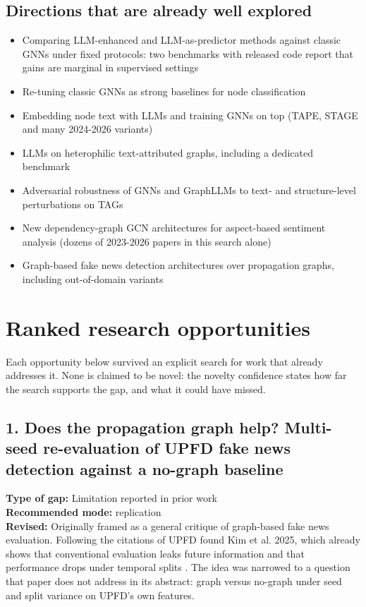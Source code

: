 \documentclass[11pt,a4paper]{article}
\begin{document}
\subsection{Directions that are already well explored}

\begin{itemize}
\item [V] Comparing LLM-enhanced and LLM-as-predictor methods against classic GNNs under fixed protocols: two benchmarks with released code report that gains are marginal in supervised settings \cite{li2024glbench,wu2025llmnodebed}
\item [V] Re-tuning classic GNNs as strong baselines for node classification \cite{luo2024classic}
\item [V] Embedding node text with LLMs and training GNNs on top (TAPE, STAGE and many 2024-2026 variants) \cite{he2023tape,zolnai2024stage}
\item [V] LLMs on heterophilic text-attributed graphs, including a dedicated benchmark \cite{li2025hetgb,wu2024llmhetero,wu2025llmnodebed}
\item [V] Adversarial robustness of GNNs and GraphLLMs to text- and structure-level perturbations on TAGs \cite{lei2024intruding,lei2025tagrobust,ma2026poisoning,fan2026vulnerability}
\item [V] New dependency-graph GCN architectures for aspect-based sentiment analysis (dozens of 2023-2026 papers in this search alone) \cite{zhao2023rdgcn,huang2025mvasegcn,li2024sebert}
\item [V] Graph-based fake news detection architectures over propagation graphs, including out-of-domain variants \cite{phan2023fakesurvey,gong2023fakesurvey,gong2024csda}
\end{itemize}

\section{Ranked research opportunities}

Each opportunity below survived an explicit search for work that already addresses it. None is claimed to be novel: the novelty confidence states how far the search supports the gap, and what it could have missed.

\subsection{1. Does the propagation graph help? Multi-seed re-evaluation of UPFD fake news detection against a no-graph baseline}
\textbf{Type of gap:} Limitation reported in prior work\\
\textbf{Recommended mode:} replication\\
\textbf{Revised:} Originally framed as a general critique of graph-based fake news evaluation. Following the citations of UPFD found Kim et al. 2025, which already shows that conventional evaluation leaks future information and that performance drops under temporal splits \cite{kim2025dawn}. The idea was narrowed to a question that paper does not address in its abstract: graph versus no-graph under seed and split variance on UPFD's own features.
\end{document}
